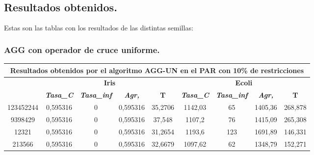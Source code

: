 \documentclass[12pt, spanish]{article}
\begin{document}
\newpage


\subsection{Resultados obtenidos.}

Estas son las tablas con los resultados de las distintas semillas:



\subsubsection{AGG con operador de cruce uniforme.}

\begin{table}[H]
\footnotesize
\begin{tabular}{|c|c|c|c|c|c|c|c|c|}
\hline
\multicolumn{9}{|c|}{\textbf{Resultados obtenidos por el algoritmo AGG-UN en el PAR con 10\% de restricciones}}                                                                                                   \\ \hline
\multirow{2}{*}{} & \multicolumn{4}{c|}{\textbf{Iris}}                                                            & \multicolumn{4}{c|}{\textbf{Ecoli}}                                                           \\ \cline{2-9} 
                  & \textit{\textbf{Tasa\_C}} & \textit{\textbf{Tasa\_inf}} & \textit{\textbf{Agr,}} & \textbf{T} & \textit{\textbf{Tasa\_C}} & \textit{\textbf{Tasa\_inf}} & \textit{\textbf{Agr,}} & \textbf{T} \\ \hline
123452244         & 0,595316                  & 0                           & 0,595316               & 35,2706    & 1142,03                   & 65                          & 1405,36                & 268,878    \\ \hline
9398429           & 0,595316                  & 0                           & 0,595316               & 37,548     & 1107,2                    & 76                          & 1415,09                & 265,308    \\ \hline
12321             & 0,595316                  & 0                           & 0,595316               & 31,2654    & 1193,6                    & 123                         & 1691,89                & 146,331    \\ \hline
213566            & 0,595316                  & 0                           & 0,595316               & 32,6679    & 1097,62                   & 62                          & 1348,79                & 152,271    \\ \hline

\end{tabular}
\end{table}
\end{document}
